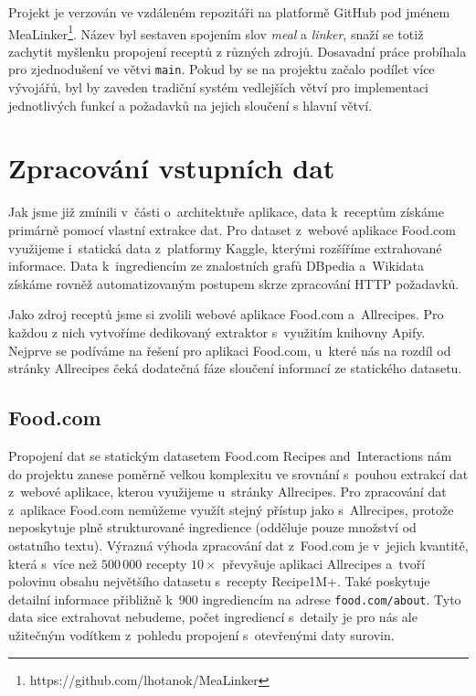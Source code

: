 Projekt je verzován ve vzdáleném repozitáři na platformě GitHub pod jménem MeaLinker\footnote{https://github.com/lhotanok/MeaLinker}. Název byl sestaven spojením slov \emph{meal} a \emph{linker}, snaží se totiž zachytit myšlenku propojení receptů z různých zdrojů. Dosavadní práce probíhala pro zjednodušení ve větvi \texttt{main}. Pokud by se na projektu začalo podílet více vývojářů, byl by zaveden tradiční systém vedlejších větví pro implementaci jednotlivých funkcí a požadavků na jejich sloučení s hlavní větví.

\section{Zpracování vstupních dat}

Jak jsme již zmínili v~části o~architektuře aplikace, data k~receptům získáme primárně pomocí vlastní extrakce dat. Pro dataset z~webové aplikace Food.com využijeme i~statická data z~platformy Kaggle, kterými rozšíříme extrahované informace. Data k~ingrediencím ze znalostních grafů DBpedia a~Wikidata získáme rovněž automatizovaným postupem skrze zpracování HTTP požadavků.

Jako zdroj receptů jsme si zvolili webové aplikace Food.com a~Allrecipes. Pro každou z nich vytvoříme dedikovaný extraktor s~využitím knihovny Apify. Nejprve se podíváme na řešení pro aplikaci Food.com, u~které nás na rozdíl od stránky Allrecipes čeká dodatečná fáze sloučení informací ze statického datasetu.

\subsection{Food.com}

Propojení dat se statickým datasetem Food.com Recipes and~Interactions nám do projektu zanese poměrně velkou komplexitu ve srovnání s~pouhou extrakcí dat z~webové aplikace, kterou využijeme u~stránky Allrecipes. Pro zpracování dat z~aplikace Food.com nemůžeme využít stejný přístup jako s~Allrecipes, protože neposkytuje plně strukturované ingredience (odděluje pouze množství od ostatního textu). Výrazná výhoda zpracování dat z~Food.com je v~jejich kvantitě, která s~více než $500\,000$ recepty $10\times$ převyšuje aplikaci Allrecipes a~tvoří polovinu obsahu největšího datasetu s~recepty Recipe1M+. Také poskytuje detailní informace přibližně k~$900$ ingrediencím na adrese \texttt{food.com/about}. Tyto data sice extrahovat nebudeme, počet ingrediencí s~detaily je pro nás ale užitečným vodítkem z~pohledu propojení s~otevřenými daty surovin.

